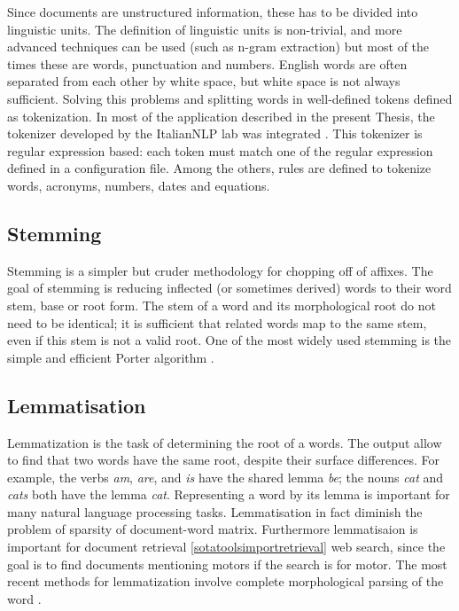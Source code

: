 \documentclass[]{book}
\begin{document}
Since documents are unstructured information, these has to be divided
into linguistic units. The definition of linguistic units is
non-trivial, and more advanced techniques can be used (such as n-gram
extraction) but most of the times these are words, punctuation and
numbers. English words are often separated from each other by white
space, but white space is not always sufficient. Solving this problems
and splitting words in well-defined tokens defined as tokenization. In
most of the application described in the present Thesis, the tokenizer
developed by the ItalianNLP lab was integrated
\citep{dell2009ensemble, attardi2009reverse, attardi2009accurate}. This
tokenizer is regular expression based: each token must match one of the
regular expression defined in a configuration file. Among the others,
rules are defined to tokenize words, acronyms, numbers, dates and
equations.

\subsection{Stemming}\label{sotatoolstransformstemming}

Stemming is a simpler but cruder methodology for chopping off of
affixes. The goal of stemming is reducing inflected (or sometimes
derived) words to their word stem, base or root form. The stem of a word
and its morphological root do not need to be identical; it is sufficient
that related words map to the same stem, even if this stem is not a
valid root. One of the most widely used stemming is the simple and
efficient Porter algorithm \citep{porter1980algorithm}.

\subsection{Lemmatisation}\label{sotatoolstransformlemmatisation}

Lemmatization is the task of determining the root of a words. The output
allow to find that two words have the same root, despite their surface
differences. For example, the verbs \emph{am}, \emph{are}, and \emph{is}
have the shared lemma \emph{be}; the nouns \emph{cat} and \emph{cats}
both have the lemma \emph{cat}. Representing a word by its lemma is
important for many natural language processing tasks. Lemmatisation in
fact diminish the problem of sparsity of document-word matrix.
Furthermore lemmatisaion is important for document retrieval
\ref{sotatoolsimportretrieval} web search, since the goal is to find
documents mentioning motors if the search is for motor. The most recent
methods for lemmatization involve complete morphological parsing of the
word \citep{hankamer1989morphological}.
\end{document}
